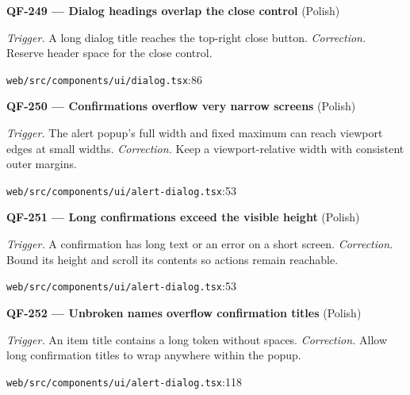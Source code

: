 \begin{minipage}{\linewidth}
\textbf{QF-249 --- Dialog headings overlap the close control} {\scriptsize\color{accent}(Polish)}\par
\textit{Trigger.} A long dialog title reaches the top-right close button. \textit{Correction.} Reserve header space for the close control.\par
{\scriptsize\color{muted}\nolinkurl{web/src/components/ui/dialog.tsx}:86}\par
\end{minipage}\par\vspace{7pt}
\begin{minipage}{\linewidth}
\textbf{QF-250 --- Confirmations overflow very narrow screens} {\scriptsize\color{accent}(Polish)}\par
\textit{Trigger.} The alert popup's full width and fixed maximum can reach viewport edges at small widths. \textit{Correction.} Keep a viewport-relative width with consistent outer margins.\par
{\scriptsize\color{muted}\nolinkurl{web/src/components/ui/alert-dialog.tsx}:53}\par
\end{minipage}\par\vspace{7pt}
\begin{minipage}{\linewidth}
\textbf{QF-251 --- Long confirmations exceed the visible height} {\scriptsize\color{accent}(Polish)}\par
\textit{Trigger.} A confirmation has long text or an error on a short screen. \textit{Correction.} Bound its height and scroll its contents so actions remain reachable.\par
{\scriptsize\color{muted}\nolinkurl{web/src/components/ui/alert-dialog.tsx}:53}\par
\end{minipage}\par\vspace{7pt}
\begin{minipage}{\linewidth}
\textbf{QF-252 --- Unbroken names overflow confirmation titles} {\scriptsize\color{accent}(Polish)}\par
\textit{Trigger.} An item title contains a long token without spaces. \textit{Correction.} Allow long confirmation titles to wrap anywhere within the popup.\par
{\scriptsize\color{muted}\nolinkurl{web/src/components/ui/alert-dialog.tsx}:118}\par
\end{minipage}\par\vspace{7pt}
